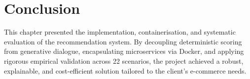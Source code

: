 \section{Conclusion}

This chapter presented the implementation, containerisation, and systematic evaluation of the recommendation system. By decoupling deterministic scoring from generative dialogue, encapsulating microservices via Docker, and applying rigorous empirical validation across 22 scenarios, the project achieved a robust, explainable, and cost-efficient solution tailored to the client's e-commerce needs.

\clearpage
